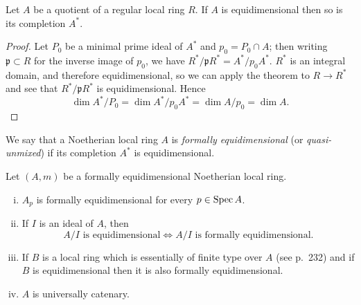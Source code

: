 \begin{corollary*}
Let $A$ be a quotient of a regular local ring $R$. If $A$ is equidimensional then
so is its completion $A^*$.
\end{corollary*}

\begin{proof}
Let $P_0$ be a minimal prime ideal of $A^*$ and $p_0 = P_0 \cap A$; then writing
$\mathfrak{p} \subset R$ for the inverse image of $p_0$, we have
$R^*/\mathfrak{p}R^* = A^*/p_0A^*$. $R^*$ is an integral domain, and therefore
equidimensional, so we can apply the theorem to $R \to R^*$ and see that
$R^*/\mathfrak{p}R^*$ is equidimensional. Hence
\[
  \dim A^*/P_0 = \dim A^*/p_0A^* = \dim A/p_0 = \dim A.
\]
\end{proof}

\begin{definition*}
We say that a Noetherian local ring $A$ is \emph{formally equidimensional} (or
\emph{quasi-unmixed}) if its completion $A^*$ is equidimensional.
\end{definition*}

\begin{theorem}\label{thm:31.6}
Let $(A, m)$ be a formally equidimensional Noetherian local ring.
\begin{enumerate}[(i)]
  \item $A_p$ is formally equidimensional for every $p \in \operatorname{Spec} A$.
  \item If $I$ is an ideal of $A$, then
        \[
          A/I \text{ is equidimensional} \iff A/I \text{ is formally equidimensional}.
        \]
  \item If $B$ is a local ring which is essentially of finite type over $A$ (see
        p.~232) and if $B$ is equidimensional then it is also formally
        equidimensional.
  \item $A$ is universally catenary.
\end{enumerate}
\end{theorem}


